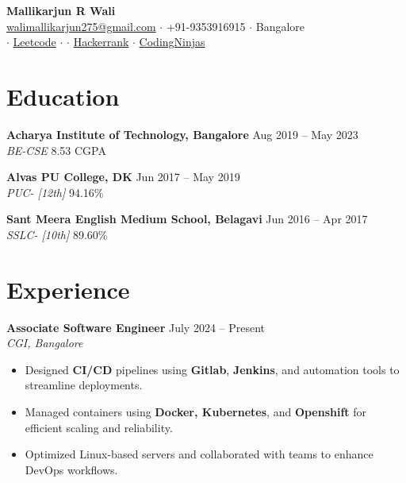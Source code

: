 \documentclass[a4paper,10pt]{article}
\begin{document}
\pagestyle{empty}

\begin{center}
    {\LARGE \textbf{Mallikarjun R Wali}} \\
    \vspace{0.1cm}
    \href{mailto:walimallikarjun275@gmail.com}{walimallikarjun275@gmail.com} $\cdot$ +91-9353916915 $\cdot$ Bangalore \\
    \vspace{0.1cm}
    \href{https://www.linkedin.com/in/mallikarjun-r-wali-29768722b}{ \faLinkedin } $\cdot$ \href{https://leetcode.com/Mallikarjun_W/}{Leetcode} $\cdot$ \href{https://github.com/Mallikarjun9353/}{\faGithub} $\cdot$ 
    \href{https://www.hackerrank.com/profile/walimallikarjun2}{Hackerrank} $\cdot$ 
    \href{https://www.codingninjas.com/studio/profile/Wali}{CodingNinjas} \\
\end{center}

\section*{Education}
\noindent\textbf{Acharya Institute of Technology, Bangalore} \hfill Aug 2019 -- May 2023 \\
\noindent\textit{BE-CSE} \hfill 8.53 CGPA

\noindent\textbf{Alvas PU College, DK} \hfill Jun 2017 -- May 2019 \\
\noindent\textit{PUC- [12th]} \hfill 94.16\% 

\noindent\textbf{Sant Meera English Medium School, Belagavi} \hfill Jun 2016 -- Apr 2017 \\
\noindent\textit{SSLC- [10th]} \hfill 89.60\% 

\section*{Experience}
\noindent\textbf{Associate Software Engineer }\href{https://www.cgi.com/en}{\faLink} \hfill July 2024 -- Present \\
\noindent\textit{CGI, Bangalore} 
\begin{itemize}[leftmargin=0.15in]
    \setlength{\itemsep}{0.05em} %
    \setlength{\parskip}{0em}    %
    \item Designed \textbf{CI/CD} pipelines using \textbf{Gitlab}, \textbf{Jenkins}, and automation tools to streamline deployments.
    \item Managed containers using \textbf{Docker, Kubernetes}, and \textbf{Openshift} for efficient scaling and reliability.
    \item Optimized Linux-based servers and collaborated with teams to enhance DevOps workflows.
\end{itemize}
\end{document}
